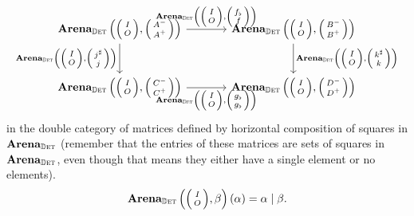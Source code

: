 \documentclass[DynamicalBook]{subfiles}
\begin{document}
\begin{proposition}
\begin{itemize}
\[\begin{tikzcd}[sep = large]
        \Cat{Arena}_{\determ}\left(\littlelens{I}{O}, \littlelens{A^-}{A^+} \right) \ar[r, "{\Cat{Arena}_{\determ}\left(\littlelens{I}{O}, \littlelens{f_{\flat}}{f} \right)}"]  \ar[d, "{\Cat{Arena}_{\determ}\left(\littlelens{I}{O}, \littlelens{j^{\sharp}}{j} \right)}"'] 
         &  \Cat{Arena}_{\determ}\left(\littlelens{I}{O}, \littlelens{B^-}{B^+} \right)\ar[d,
        "{ \Cat{Arena}_{\determ}\left(\littlelens{I}{O}, \littlelens{k^{\sharp}}{k} \right) }"] \\
   \Cat{Arena}_{\determ}\left(\littlelens{I}{O}, \littlelens{C^-}{C^+} \right)      \ar[r, "{\Cat{Arena}_{\determ}\left(\littlelens{I}{O}, \littlelens{g_{\flat}}{g_{\flat}} \right)}"']  & \Cat{Arena}_{\determ}\left(\littlelens{I}{O}, \littlelens{D^-}{D^+} \right)
      \end{tikzcd}
    \]
    in the double category of matrices defined by horizontal composition of
    squares in $\textbf{Arena}_{\mathbb{D}\textsc{et}}$ (remember that the entries of these matrices are
    sets of squares in $\textbf{Arena}_{\mathbb{D}\textsc{et}}$, even though that means they either have a
    single element or no elements).
    \begin{align*}
    \Cat{Arena}_{\determ}\left(\littlelens{I}{O}, \beta \right)(\alpha) = \alpha \mid \beta.
\end{align*}
\end{itemize}
\end{proposition}
\end{document}
